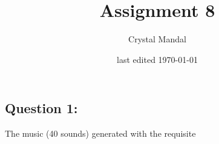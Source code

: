 \documentclass[12pt,letterpaper]{article}
\title{Assignment 8}
\author{Crystal Mandal}
\date{last edited \today}
\begin{document}
\maketitle

\subsection*{Question 1:}
The music (40 sounds) generated with the requisite 
\end{document}
